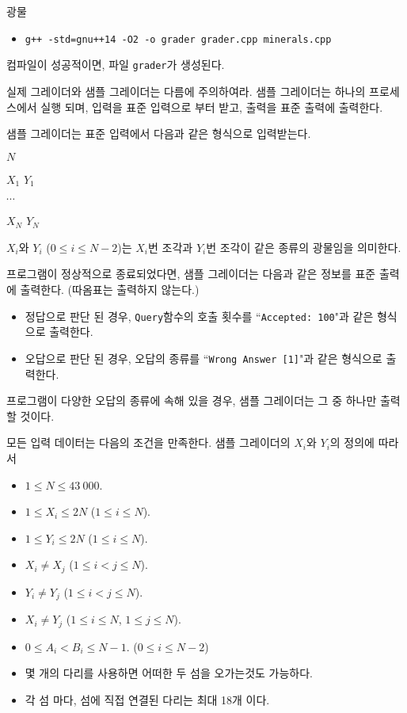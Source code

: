 \begin{problem}{광물}
	\begin{itemize}
		\item \texttt{g++ -std=gnu++14 -O2 -o grader grader.cpp minerals.cpp}
	\end{itemize}
	
	컴파일이 성공적이면, 파일 \texttt{grader}가 생성된다.
	
	실제 그레이더와 샘플 그레이더는 다름에 주의하여라. 샘플 그레이더는 하나의 프로세스에서 실행 되며, 입력을 표준 입력으로 부터 받고, 출력을 표준 출력에 출력한다.
	
	\InputFile
	
	샘플 그레이더는 표준 입력에서 다음과 같은 형식으로 입력받는다.
	
	$N$
	
	$X_1$ $Y_1$
	
	$\cdots$
	
	$X_N$ $Y_N$
		
	$X_i$와 $Y_i$ ($0 \le i \le N-2$)는 $X_i$번 조각과 $Y_i$번 조각이 같은 종류의 광물임을 의미한다.
	
	\OutputFile
	
	프로그램이 정상적으로 종료되었다면, 샘플 그레이더는 다음과 같은 정보를 표준 출력에 출력한다. (따옴표는 출력하지 않는다.)
	
	\begin{itemize}
		\item 정답으로 판단 된 경우, \texttt{Query}함수의 호출 횟수를 ``\texttt{Accepted: 100}"과 같은 형식으로 출력한다.
		\item 오답으로 판단 된 경우, 오답의 종류를 ``\texttt{Wrong Answer [1]}"과 같은 형식으로 출력한다.
	\end{itemize}
	
	프로그램이 다양한 오답의 종류에 속해 있을 경우, 샘플 그레이더는 그 중 하나만 출력 할 것이다.
	
	\Constraints
	
	모든 입력 데이터는 다음의 조건을 만족한다. 샘플 그레이더의 $X_i$와 $Y_i$의 정의에 따라서
	
	\begin{itemize}
		\item $1 \le N \le 43\ 000$.
		\item $1 \le X_i \le 2N$ ($1 \le i \le N$).
		\item $1 \le Y_i \le 2N$ ($1 \le i \le N$).
		\item $X_i \ne X_j $ ($1 \le i < j \le N$).
		\item $Y_i \ne Y_j $ ($1 \le i < j \le N$).
		\item $X_i \ne Y_j$ ($1 \le i \le N$, $1 \le j \le N$).
		\item $0 \le A_i < B_i \le N-1$. ($0 \le i \le N-2$)
		\item 몇 개의 다리를 사용하면 어떠한 두 섬을 오가는것도 가능하다.
		\item 각 섬 마다, 섬에 직접 연결된 다리는 최대 18개 이다.
	\end{itemize}
	

\end{problem}

